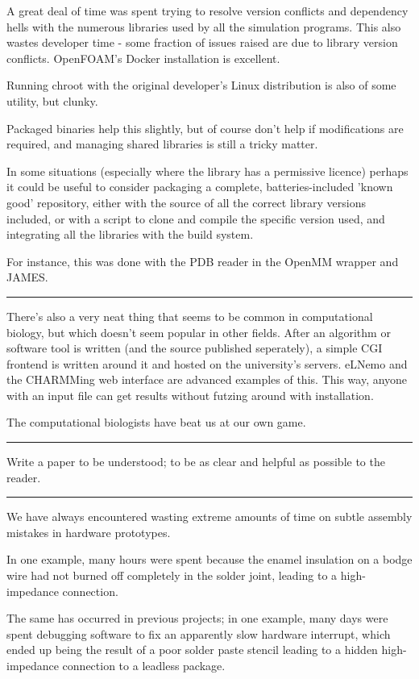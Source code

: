 \documentclass[fleqn,10pt]{article}
\begin{document}
\begin{multicols}{1}
A great deal of time was spent trying to resolve version conflicts and dependency hells with the numerous libraries used by all the simulation programs. This also wastes developer time - some fraction of issues raised are due to library version conflicts. OpenFOAM's Docker installation is excellent.

Running chroot with the original developer's Linux distribution is also of some utility, but clunky. 

Packaged binaries help this slightly, but of course don't help if modifications are required, and managing shared libraries is still a tricky matter.

In some situations (especially where the library has a permissive licence) perhaps it could be useful to consider packaging a complete, batteries-included 'known good' repository, either with the source of all the correct library versions included, or with a script to clone and compile the specific version used, and integrating all the libraries with the build system. 

For instance, this was done with the PDB reader in the OpenMM wrapper and JAMES.

\rule{\linewidth}{0.2pt}

There's also a very neat thing that seems to be common in computational biology, but which doesn't seem popular in other fields. After an algorithm or software tool is written (and the source published seperately), a simple CGI frontend is written around it and hosted on the university's servers. eLNemo and the CHARMMing web interface are advanced examples of this. This way, anyone with an input file can get results without futzing around with installation. 

The computational biologists have beat us at our own game.

\rule{\linewidth}{0.2pt}


Write a paper to be understood; to be as clear and helpful as possible to the reader.

\rule{\linewidth}{0.2pt}

We have always encountered wasting extreme amounts of time on subtle assembly mistakes in hardware prototypes. 

In one example, many hours were spent because the enamel insulation on a bodge wire had not burned off completely in the solder joint, leading to a high-impedance connection.

The same has occurred in previous projects; in one example, many days were spent debugging software to fix an apparently slow hardware interrupt, which ended up being the result of a poor solder paste stencil leading to a hidden high-impedance connection to a leadless package.


\end{multicols}
\end{document}
